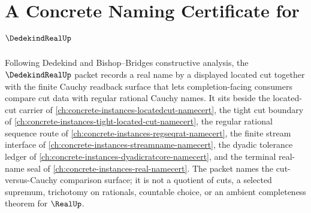 \chapter{A Concrete Naming Certificate for $\DedekindRealUp$}
\label{ch:concrete-instances-dedekind-real-namecert}

Following Dedekind and Bishop--Bridges constructive analysis, the $\DedekindRealUp$ packet records a real name by a displayed located cut together with the finite Cauchy readback surface that lets completion-facing consumers compare cut data with regular rational Cauchy names. It sits beside the located-cut carrier of \autoref{ch:concrete-instances-locatedcut-namecert}, the tight cut boundary of \autoref{ch:concrete-instances-tight-located-cut-namecert}, the regular rational sequence route of \autoref{ch:concrete-instances-regseqrat-namecert}, the finite stream interface of \autoref{ch:concrete-instances-streamname-namecert}, the dyadic tolerance ledger of \autoref{ch:concrete-instances-dyadicratcore-namecert}, and the terminal real-name seal of \autoref{ch:concrete-instances-real-namecert}. The packet names the cut-versus-Cauchy comparison surface; it is not a quotient of cuts, a selected supremum, trichotomy on rationals, countable choice, or an ambient completeness theorem for $\RealUp$.

